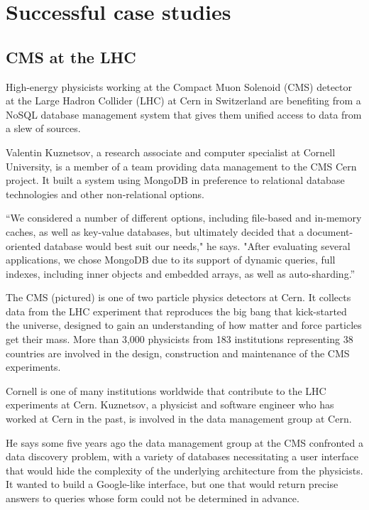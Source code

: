 \chapter{Successful case studies}

\section{CMS at the LHC}

High-energy physicists working at the Compact Muon Solenoid (CMS) detector at the Large Hadron Collider (LHC) at Cern in Switzerland are benefiting from a NoSQL database management system that gives them unified access to data from a slew of sources.

Valentin Kuznetsov, a research associate and computer specialist at Cornell University, is a member of a team providing data management to the CMS Cern project. It built a system using MongoDB in preference to relational database technologies and other non-relational options.

``We considered a number of different options, including file-based and in-memory caches, as well as key-value databases, but ultimately decided that a document-oriented database would best suit our needs," he says. "After evaluating several applications, we chose MongoDB due to its support of dynamic queries, full indexes, including inner objects and embedded arrays, as well as auto-sharding.''

The CMS (pictured) is one of two particle physics detectors at Cern. It collects data from the LHC experiment that reproduces the big bang that kick-started the universe, designed to gain an understanding of how matter and force particles get their mass. More than 3,000 physicists from 183 institutions representing 38 countries are involved in the design, construction and maintenance of the CMS experiments.

Cornell is one of many institutions worldwide that contribute to the LHC experiments at Cern. Kuznetsov, a physicist and software engineer who has worked at Cern in the past, is involved in the data management group at Cern.

He says some five years ago the data management group at the CMS confronted a data discovery problem, with a variety of databases necessitating a user interface that would hide the complexity of the underlying architecture from the physicists. It wanted to build a Google-like interface, but one that would return precise answers to queries whose form could not be determined in advance.

